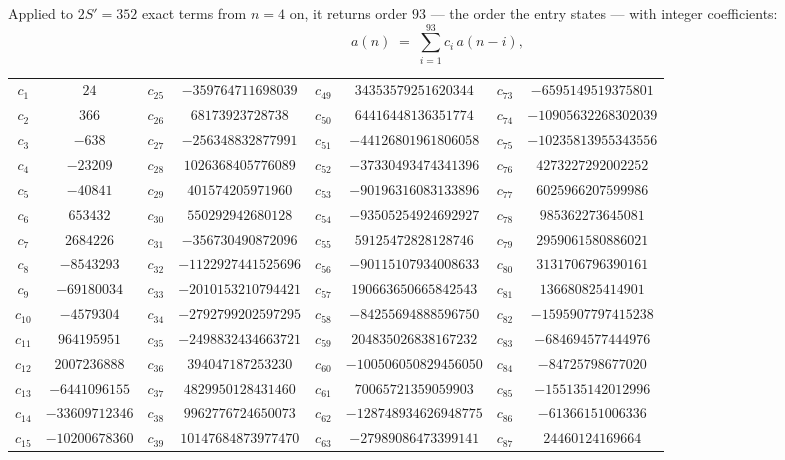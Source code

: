 \documentclass[11pt,a4paper]{article}
\theoremstyle{plain}
\theoremstyle{definition}
\begin{document}
Applied to $2S'=352$ exact terms from $n=4$ on, it returns order $93$ --- the
order the entry states --- with integer coefficients:
\[
a(n)\;=\;\sum_{i=1}^{93}c_i\,a(n-i),
\]
\begin{center}\small
\begin{tabular}{cccccccc}
$c_{1}$ & $24$ & $c_{25}$ & $-359764711698039$ & $c_{49}$ & $34353579251620344$ & $c_{73}$ & $-6595149519375801$ \\
$c_{2}$ & $366$ & $c_{26}$ & $68173923728738$ & $c_{50}$ & $64416448136351774$ & $c_{74}$ & $-10905632268302039$ \\
$c_{3}$ & $-638$ & $c_{27}$ & $-256348832877991$ & $c_{51}$ & $-44126801961806058$ & $c_{75}$ & $-10235813955343556$ \\
$c_{4}$ & $-23209$ & $c_{28}$ & $1026368405776089$ & $c_{52}$ & $-37330493474341396$ & $c_{76}$ & $4273227292002252$ \\
$c_{5}$ & $-40841$ & $c_{29}$ & $401574205971960$ & $c_{53}$ & $-90196316083133896$ & $c_{77}$ & $6025966207599986$ \\
$c_{6}$ & $653432$ & $c_{30}$ & $550292942680128$ & $c_{54}$ & $-93505254924692927$ & $c_{78}$ & $985362273645081$ \\
$c_{7}$ & $2684226$ & $c_{31}$ & $-356730490872096$ & $c_{55}$ & $59125472828128746$ & $c_{79}$ & $2959061580886021$ \\
$c_{8}$ & $-8543293$ & $c_{32}$ & $-1122927441525696$ & $c_{56}$ & $-90115107934008633$ & $c_{80}$ & $3131706796390161$ \\
$c_{9}$ & $-69180034$ & $c_{33}$ & $-2010153210794421$ & $c_{57}$ & $190663650665842543$ & $c_{81}$ & $136680825414901$ \\
$c_{10}$ & $-4579304$ & $c_{34}$ & $-2792799202597295$ & $c_{58}$ & $-84255694888596750$ & $c_{82}$ & $-1595907797415238$ \\
$c_{11}$ & $964195951$ & $c_{35}$ & $-2498832434663721$ & $c_{59}$ & $204835026838167232$ & $c_{83}$ & $-684694577444976$ \\
$c_{12}$ & $2007236888$ & $c_{36}$ & $394047187253230$ & $c_{60}$ & $-100506050829456050$ & $c_{84}$ & $-84725798677020$ \\
$c_{13}$ & $-6441096155$ & $c_{37}$ & $4829950128431460$ & $c_{61}$ & $70065721359059903$ & $c_{85}$ & $-155135142012996$ \\
$c_{14}$ & $-33609712346$ & $c_{38}$ & $9962776724650073$ & $c_{62}$ & $-128748934626948775$ & $c_{86}$ & $-61366151006336$ \\
$c_{15}$ & $-10200678360$ & $c_{39}$ & $10147684873977470$ & $c_{63}$ & $-27989086473399141$ & $c_{87}$ & $24460124169664$ \\

\end{tabular}
\end{center}
\end{document}
